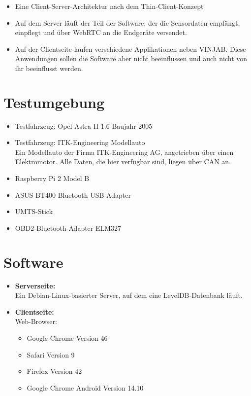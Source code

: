 \documentclass[pflichtenheft.tex]{subfiles}
\begin{document}
\begin{itemize}

\item
Eine Client-Server-Architektur nach dem Thin-Client-Konzept
\item
Auf dem Server läuft der Teil der Software, der die Sensordaten empfängt, einpflegt und über WebRTC an die Endgeräte versendet.
\item
Auf der Clientseite laufen verschiedene Applikationen neben VINJAB. Diese Anwendungen sollen die Software aber nicht beeinflussen und auch nicht von ihr beeinflusst werden.
\end{itemize}

\section*{Testumgebung}
\begin{itemize}
\item
Testfahrzeug: Opel Astra H 1.6 Baujahr 2005
\item
Testfahrzeug: ITK-Engineering Modellauto \\
Ein Modellauto der Firma ITK-Engineering AG, angetrieben über einen Elektromotor. Alle Daten, die hier verfügbar sind, liegen über CAN an.
\item
Raspberry Pi 2 Model B
\item
ASUS BT400 Bluetooth USB Adapter
\item
UMTS-Stick
\item
OBD2-Bluetooth-Adapter ELM327
\end{itemize}


\section{Software}
\begin{itemize}
\item
\textbf{Serverseite:}\\
Ein Debian-Linux-basierter Server, auf dem eine LevelDB-Datenbank läuft.
\item
\textbf{Clientseite:}\\
Web-Browser:
\begin{itemize}
\item
Google Chrome Version 46
\item
Safari Version 9
\item
Firefox Version 42
\item
Google Chrome Android Version 14.10
\end{itemize}
\end{itemize}
\end{document}
